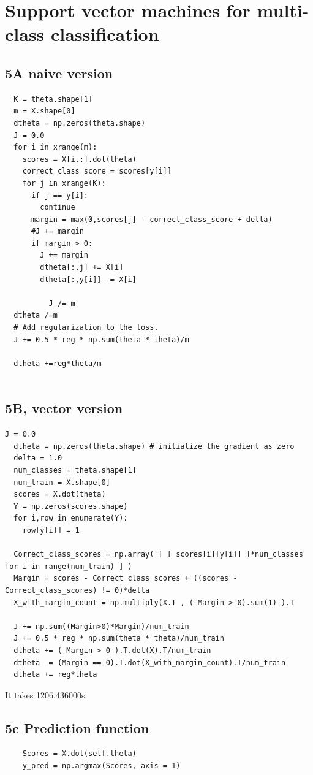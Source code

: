 \documentclass[pdftex,11pt]{article}
\begin{document}
\section{Support vector machines for multi-class classification}
\subsection{5A naive version}

\begin{lstlisting}
  K = theta.shape[1]
  m = X.shape[0]
  dtheta = np.zeros(theta.shape)
  J = 0.0
  for i in xrange(m):
    scores = X[i,:].dot(theta)
    correct_class_score = scores[y[i]]
    for j in xrange(K):
      if j == y[i]:
        continue
      margin = max(0,scores[j] - correct_class_score + delta)
      #J += margin
      if margin > 0:
        J += margin
        dtheta[:,j] += X[i]
        dtheta[:,y[i]] -= X[i] 
        
          J /= m
  dtheta /=m
  # Add regularization to the loss.
  J += 0.5 * reg * np.sum(theta * theta)/m

  dtheta +=reg*theta/m
        
\end{lstlisting}
\subsection{5B, vector version}
\begin{lstlisting}
J = 0.0
  dtheta = np.zeros(theta.shape) # initialize the gradient as zero
  delta = 1.0
  num_classes = theta.shape[1]
  num_train = X.shape[0]
  scores = X.dot(theta)
  Y = np.zeros(scores.shape)
  for i,row in enumerate(Y):
    row[y[i]] = 1
  
  Correct_class_scores = np.array( [ [ scores[i][y[i]] ]*num_classes for i in range(num_train) ] )  
  Margin = scores - Correct_class_scores + ((scores - Correct_class_scores) != 0)*delta
  X_with_margin_count = np.multiply(X.T , ( Margin > 0).sum(1) ).T

  J += np.sum((Margin>0)*Margin)/num_train
  J += 0.5 * reg * np.sum(theta * theta)/num_train
  dtheta += ( Margin > 0 ).T.dot(X).T/num_train
  dtheta -= (Margin == 0).T.dot(X_with_margin_count).T/num_train
  dtheta += reg*theta
\end{lstlisting}
It takes 1206.436000s.
\subsection{5c Prediction function}
\begin{lstlisting}
    Scores = X.dot(self.theta)
    y_pred = np.argmax(Scores, axis = 1)
\end{lstlisting}
\end{document}
